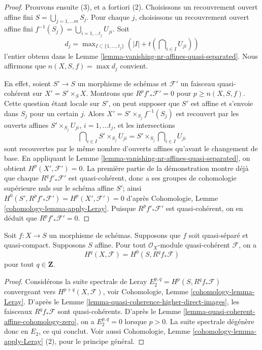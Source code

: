 \begin{proof}
\medskip\noindent
Prouvons ensuite (3), et a fortiori (2). Choisissons un recouvrement ouvert affine
fini $S = \bigcup_{j = 1, \ldots m} S_j$. Pour chaque $j$, choisissons
un recouvrement ouvert affine fini
$f^{-1}(S_j) = \bigcup_{i = 1, \ldots t_j} U_{ji} $.
Soit
$$
d_j = \max\nolimits_{I \subset \{1, \ldots, t_j\}}
\left(|I| + t(\bigcap\nolimits_{i \in I} U_{ji})\right)
$$
l'entier obtenu dans le
Lemme \ref{lemma-vanishing-nr-affines-quasi-separated}.
Nous affirmons que $n(X, S, f) = \max d_j$ convient.

\medskip\noindent
En effet, soient $S' \to S$ un morphisme de schémas et
$\mathcal{F}'$ un faisceau quasi-cohérent sur $X' = S' \times_S X$.
Montrons que $R^pf'_*\mathcal{F}' = 0$ pour $p \geq n(X, S, f)$.
Cette question étant locale sur $S'$, on peut supposer que $S'$ est affine
et s'envoie dans $S_j$ pour un certain $j$. Alors $X' = S' \times_{S_j} f^{-1}(S_j)$
est recouvert par les ouverts affines $S' \times_{S_j} U_{ji}$, $i = 1, \ldots t_j$,
et les intersections
$$
\bigcap\nolimits_{i \in I} S' \times_{S_j} U_{ji} =
S' \times_{S_j} \bigcap\nolimits_{i \in I} U_{ji}
$$
sont recouvertes par le même nombre d'ouverts affines qu'avant le changement de base.
En appliquant le
Lemme \ref{lemma-vanishing-nr-affines-quasi-separated},
on obtient $H^p(X', \mathcal{F}') = 0$. La première partie de la démonstration
montre déjà que chaque $R^qf'_*\mathcal{F}'$ est quasi-cohérent,
donc a ses groupes de cohomologie supérieure nuls sur le schéma affine $S'$;
ainsi $H^0(S', R^pf'_*\mathcal{F}') = H^p(X', \mathcal{F}') = 0$
d'après Cohomologie, Lemme \ref{cohomology-lemma-apply-Leray}.
Puisque $R^pf'_*\mathcal{F}'$ est quasi-cohérent,
on en déduit que $R^pf'_*\mathcal{F}' = 0$.
\end{proof}

\begin{lemma}
\label{lemma-quasi-coherence-higher-direct-images-application}
Soit $f : X \to S$ un morphisme de schémas.
Supposons que $f$ soit quasi-séparé et quasi-compact.
Supposons $S$ affine.
Pour tout $\mathcal{O}_X$-module quasi-cohérent $\mathcal{F}$,
on a
$$
H^q(X, \mathcal{F}) = H^0(S, R^qf_*\mathcal{F})
$$
pour tout $q \in \mathbf{Z}$.
\end{lemma}

\begin{proof}
Considérons la suite spectrale de Leray $E_2^{p, q} = H^p(S, R^qf_*\mathcal{F})$
convergeant vers $H^{p + q}(X, \mathcal{F})$, voir
Cohomologie, Lemme \ref{cohomology-lemma-Leray}.
D'après le Lemme \ref{lemma-quasi-coherence-higher-direct-images},
les faisceaux $R^qf_*\mathcal{F}$ sont quasi-cohérents.
D'après le Lemme \ref{lemma-quasi-coherent-affine-cohomology-zero},
on a $E_2^{p, q} = 0$ lorsque $p > 0$.
La suite spectrale dégénère donc en $E_2$, ce qui conclut.
Voir aussi
Cohomologie, Lemme \ref{cohomology-lemma-apply-Leray} (2),
pour le principe général.
\end{proof}








